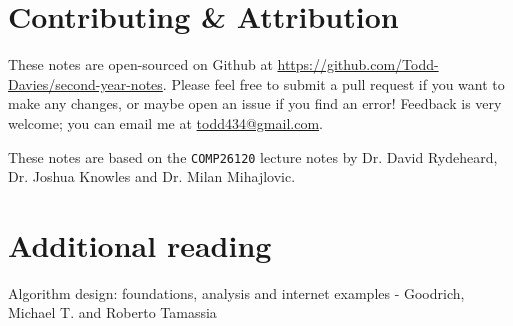 \section*{Contributing \& Attribution}

These notes are open-sourced on Github at
\url{https://github.com/Todd-Davies/second-year-notes}. Please feel free to
submit a pull request if you want to make any changes, or maybe open an issue
if you find an error! Feedback is very welcome; you can email me at
\href{mailto:todd434@gmail.com}{todd434@gmail.com}.

These notes are based on the \texttt{COMP26120} lecture notes by Dr. David
Rydeheard, Dr. Joshua Knowles and Dr. Milan Mihajlovic.

\section*{Additional reading}

Algorithm design: foundations, analysis and internet examples - Goodrich,
Michael T. and Roberto Tamassia